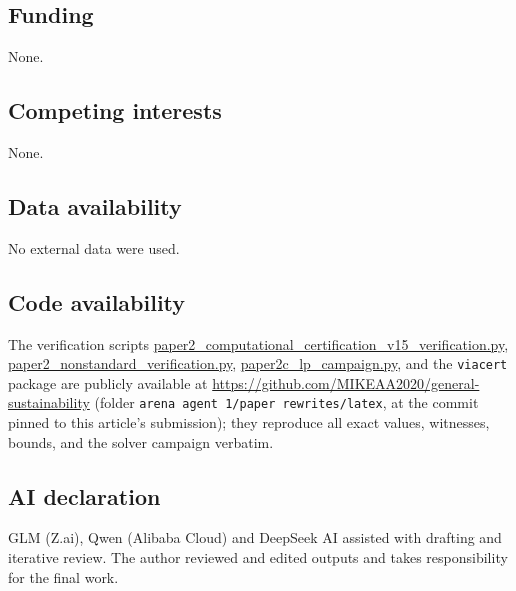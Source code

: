 \documentclass[10pt,twocolumn]{article}
\theoremstyle{plain}
\theoremstyle{definition}
\theoremstyle{remark}
\begin{document}
\subsection*{Funding}
None.

\subsection*{Competing interests}
None.

\subsection*{Data availability}
No external data were used.

\subsection*{Code availability}
The verification scripts
\url{paper2_computational_certification_v15_verification.py},
\url{paper2_nonstandard_verification.py},
\url{paper2c_lp_campaign.py}, and the \texttt{viacert} package are publicly
available at \url{https://github.com/MIKEAA2020/general-sustainability}
(folder \texttt{arena agent 1/paper rewrites/latex}, at the commit
pinned to this article's submission); they reproduce all exact values,
witnesses, bounds, and the solver campaign verbatim.

\subsection*{AI declaration}
GLM (Z.ai), Qwen (Alibaba Cloud) and DeepSeek AI assisted with drafting
and iterative review. The author reviewed and edited outputs and takes
responsibility for the final work.
\end{document}
